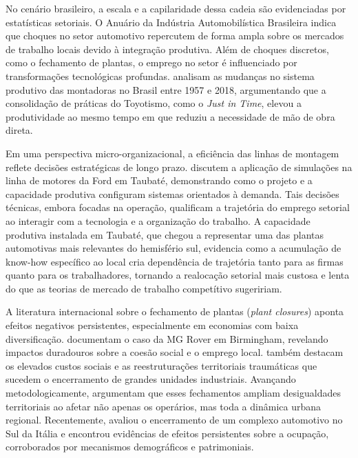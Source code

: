 \documentclass[12pt,a4paper]{article}
\begin{document}
No cen\'ario brasileiro, a escala e a capilaridade dessa cadeia s\~ao evidenciadas por estat\'isticas setoriais. O Anu\'ario da Ind\'ustria Automobilística Brasileira \parencite{anfavea2021} indica que choques no setor automotivo repercutem de forma ampla sobre os mercados de trabalho locais devido \`a integra\c{c}\~ao produtiva. Al\'em de choques discretos, como o fechamento de plantas, o emprego no setor \'e influenciado por transforma\c{c}\~oes tecnol\'ogicas profundas. \textcite{vargas2021} analisam as mudan\c{c}as no sistema produtivo das montadoras no Brasil entre 1957 e 2018, argumentando que a consolida\c{c}\~ao de pr\'aticas do Toyotismo, como o \textit{Just in Time}, elevou a produtividade ao mesmo tempo em que reduziu a necessidade de m\~ao de obra direta.

Em uma perspectiva micro-organizacional, a efici\^encia das linhas de montagem reflete decis\~oes estrat\'egicas de longo prazo. \textcite{santoro2000} discutem a aplica\c{c}\~ao de simula\c{c}\~oes na linha de motores da Ford em Taubat\'e, demonstrando como o projeto e a capacidade produtiva configuram sistemas orientados \`a demanda. Tais decis\~oes t\'ecnicas, embora focadas na opera\c{c}\~ao, qualificam a trajet\'oria do emprego setorial ao interagir com a tecnologia e a organiza\c{c}\~ao do trabalho. A capacidade produtiva instalada em Taubat\'e, que chegou a representar uma das plantas automotivas mais relevantes do hemisf\'erio sul, evidencia como a acumula\c{c}\~ao de know-how espec\'ifico ao local cria dependência de trajet\'oria tanto para as firmas quanto para os trabalhadores, tornando a realoca\c{c}\~ao setorial mais custosa e lenta do que as teorias de mercado de trabalho compet\'itivo sugeririam.

A literatura internacional sobre o fechamento de plantas (\textit{plant closures}) aponta efeitos negativos persistentes, especialmente em economias com baixa diversifica\c{c}\~ao. \textcite{chapain2008} documentam o caso da MG Rover em Birmingham, revelando impactos duradouros sobre a coes\~ao social e o emprego local. \textcite{perrucci1988} tamb\'em destacam os elevados custos sociais e as reestrutura\c{c}\~oes territoriais traum\'aticas que sucedem o encerramento de grandes unidades industriais. Avan\c{c}ando metodologicamente, \textcite{beer2019} argumentam que esses fechamentos ampliam desigualdades territoriais ao afetar n\~ao apenas os oper\'arios, mas toda a din\^amica urbana regional. Recentemente, \textcite{david2025} avaliou o encerramento de um complexo automotivo no Sul da It\'alia e encontrou evid\^encias de efeitos persistentes sobre a ocupa\c{c}\~ao, corroborados por mecanismos demogr\'aficos e patrimoniais.
\end{document}
